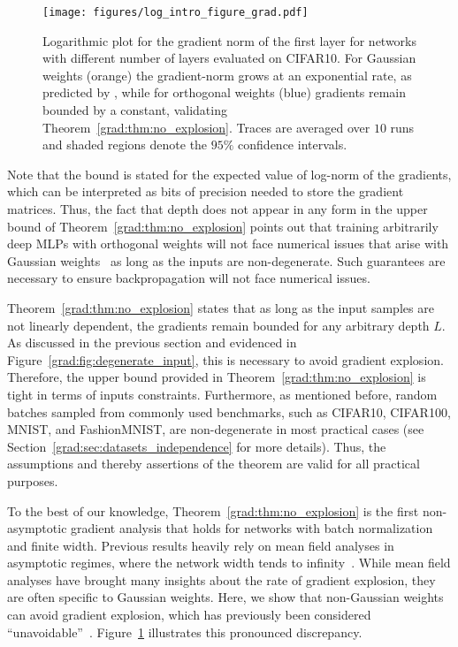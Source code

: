 \begin{figure}[ht]
    \centering
    \texttt{[image: figures/log\_intro\_figure\_grad.pdf]}
    \caption{Logarithmic plot for the gradient norm of the first layer for networks with different number of layers evaluated on CIFAR10. For Gaussian weights (orange) the gradient-norm grows at an exponential rate, as predicted by \citet[Theorem 3.9]{yang2018a}, while for orthogonal weights (blue) gradients remain bounded by a constant, validating Theorem~\ref{grad:thm:no_explosion}. Traces are averaged over $10$ runs and shaded regions denote the $95\%$ confidence intervals.}
    \label{grad:fig:linear_contrast_grad} 
\end{figure}


Note that the bound is stated for the expected value of log-norm of the gradients, which can be interpreted as bits of precision needed to store the gradient matrices. Thus, the fact that depth does not appear in any form in the upper bound of Theorem~\ref{grad:thm:no_explosion} points out that training arbitrarily deep MLPs with orthogonal weights will not face numerical issues that arise with Gaussian weights~\cite{yang2018a} as long as the inputs are non-degenerate. Such guarantees are necessary to ensure backpropagation will not face numerical issues.  

 Theorem~\ref{grad:thm:no_explosion} states that as long as the input samples are not linearly dependent, the gradients remain bounded for any arbitrary depth $L$. As discussed in the previous section and evidenced in Figure~\ref{grad:fig:degenerate_input}, this is necessary to avoid gradient explosion. Therefore, the upper bound provided in Theorem~\ref{grad:thm:no_explosion} is tight in terms of inputs constraints. Furthermore, as mentioned before, random batches sampled from commonly used benchmarks, such as CIFAR10, CIFAR100, MNIST, and FashionMNIST, are non-degenerate in most practical cases (see Section~\ref{grad:sec:datasets_independence} for more details). Thus, the assumptions and thereby assertions of the theorem are valid for all practical purposes.

To the best of our knowledge, Theorem~\ref{grad:thm:no_explosion} is the first non-asymptotic gradient analysis that holds for networks with batch normalization and finite width. Previous results heavily rely on mean field analyses in asymptotic regimes, where the network width tends to infinity~\citep{yang2018a}. While mean field analyses have brought many insights about the rate of gradient explosion, they are often specific to Gaussian weights. Here, we show that non-Gaussian weights can avoid gradient explosion, which has previously been considered ``unavoidable''~\citep{yang2018a}. Figure~\ref{grad:fig:linear_contrast_grad} illustrates this pronounced discrepancy.  

